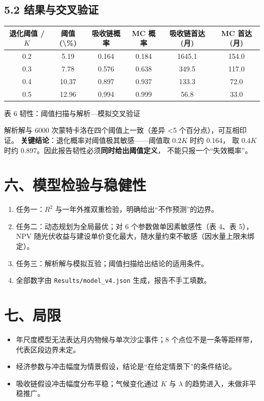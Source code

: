 \documentclass[11pt,a4paper]{ctexart}
\begin{document}
\subsection*{5.2 结果与交叉验证}
\begin{table}[H]\centering\small
\begin{tabular}{|c|c|c|c|c|c|}
\toprule
退化阈值 / $K$ & 阈值(\textbackslash{}\%) & 吸收链概率 & MC 概率 & 吸收链首达(月) & MC 首达(月) \\
\midrule
0.2 & 5.19 & 0.164 & 0.184 & 1645.1 & 154.0 \\
0.3 & 7.78 & 0.576 & 0.638 & 349.5 & 117.0 \\
0.4 & 10.37 & 0.897 & 0.937 & 133.3 & 72.0 \\
0.5 & 12.96 & 0.994 & 0.999 & 56.8 & 33.0 \\
\bottomrule
\end{tabular}
\begin{center}\small 表 6  韧性：阈值扫描与解析—模拟交叉验证\end{center}
\end{table}
解析解与 6000 次蒙特卡洛在四个阈值上一致（差异 <5 个百分点），可互相印证。
\textbf{关键结论}：退化概率对阈值极其敏感——阈值取 $0.2K$ 时约 0.164，
取 $0.4K$ 时约 0.897。因此报告韧性必须\textbf{同时给出阈值定义}，
不能只报一个“失效概率”。

\section*{六、模型检验与稳健性}
\begin{enumerate}
\item 任务一：$R^2$ 与一年外推双重检验，明确给出“不作预测”的边界。
\item 任务二：动态规划为全局最优；对 6 个参数做单因素敏感性（表 4、表 5），
NPV 随光伏收益与建设单价变化最大，随水量约束不敏感（因水量上限未绑定）。
\item 任务三：解析解与模拟互验；阈值扫描给出结论的适用条件。
\item 全部数字由 \texttt{Results/model\_v4.json} 生成，报告不手工填数。
\end{enumerate}

\section*{七、局限}
\begin{itemize}
\item 年尺度模型无法表达月内物候与单次沙尘事件；8 个点位不是一条等距样带，代表区段边界未定。
\item 经济参数与冲击幅度为情景假设，结论是“在给定情景下”的条件结论。
\item 吸收链假设冲击幅度分布平稳；气候变化通过 $K$ 与 $\lambda$ 的趋势进入，未做非平稳推广。
\end{itemize}
\end{document}
